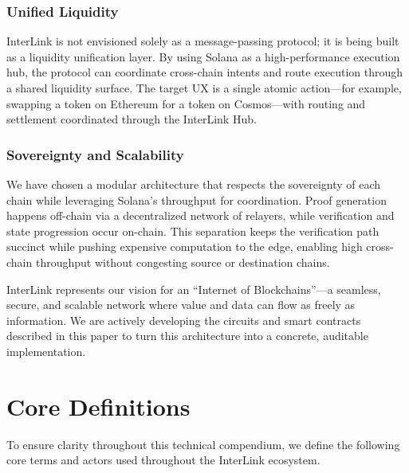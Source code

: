 \documentclass[11pt,a4paper]{article}
\begin{document}
\subsubsection{Unified Liquidity}
InterLink is not envisioned solely as a message-passing protocol; it is being built as a liquidity unification layer. By using Solana as a high-performance execution hub, the protocol can coordinate cross-chain intents and route execution through a shared liquidity surface. The target UX is a single atomic action---for example, swapping a token on Ethereum for a token on Cosmos---with routing and settlement coordinated through the InterLink Hub.

\subsubsection{Sovereignty and Scalability}
We have chosen a modular architecture that respects the sovereignty of each chain while leveraging Solana's throughput for coordination. Proof generation happens off-chain via a decentralized network of relayers, while verification and state progression occur on-chain. This separation keeps the verification path succinct while pushing expensive computation to the edge, enabling high cross-chain throughput without congesting source or destination chains.

InterLink represents our vision for an ``Internet of Blockchains''---a seamless, secure, and scalable network where value and data can flow as freely as information. We are actively developing the circuits and smart contracts described in this paper to turn this architecture into a concrete, auditable implementation.

\section{Core Definitions}
\label{sec:definitions}

To ensure clarity throughout this technical compendium, we define the following core terms and actors used throughout the InterLink ecosystem.
\end{document}
